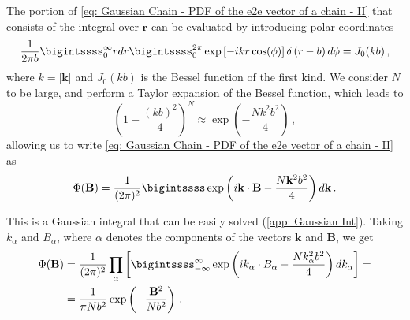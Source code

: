 \documentclass[../../main.tex]{subfiles}
\begin{document}
    The portion of \cref{eq: Gaussian Chain - PDF of the e2e vector of a chain - II} that consists of the integral over $\mathbf{r}$ can be evaluated by introducing polar coordinates
        \begin{equation}
            \frac{1}{2\pi b} \bigintssss_0^\infty r dr \bigintssss_0^{2\pi}\exp\left[ -ikr\cos(\phi)\right]\delta\left(r-b\right) d\phi = J_0(kb) \,,
        \end{equation}
     where $k = \lvert \mathbf{k} \lvert$ and $J_0(kb)$ is the Bessel function of the first kind. We consider $N$ to be large, and perform a Taylor expansion of the Bessel function, which leads to
        \begin{equation}\label{eq: Gaussian Chain - approx of the sin^N}
            \left( 1-\frac{(kb)^2}{4}\right)^N \approx \exp \left(-\frac{Nk^2b^2}{4}\right) \,,
        \end{equation}
    allowing us to write \cref{eq: Gaussian Chain - PDF of the e2e vector of a chain - II} as
        \begin{equation}\label{eq: Gaussian Chain - PDF of the e2e vector of a chain - III}
             \Phi(\mathbf{B}) = \frac{1}{(2\pi)^2} \bigintssss \exp\left( i\mathbf{k}\cdot \mathbf{B} - \frac{N\mathbf{k}^2b^2}{4} \right) d\mathbf{k} \,.
        \end{equation}
        
    This is a Gaussian integral that can be easily solved (\cref{app: Gaussian Int}). Taking $k_\alpha$ and $B_\alpha$, where $\alpha$ denotes the components of the vectors $\mathbf{k}$ and $\mathbf{B}$, we get 
        \begin{equation}\label{eq: Gaussian Chain - PDF of the e2e vector of a chain - IV}
        \begin{split}
            \Phi(\mathbf{B}) &= \frac{1}{(2\pi)^2} \prod_\alpha \left[\bigintssss_{-\infty}^\infty \exp\left( ik_\alpha\cdot B_\alpha - \frac{Nk_\alpha^2b^2}{4} \right) dk_\alpha \right] = \\
            &= \frac{1}{\pi Nb^2} \exp\left( -\frac{\mathbf{B}^2}{Nb^2} \right) \,.
        \end{split}
        \end{equation}
    
\end{document}
